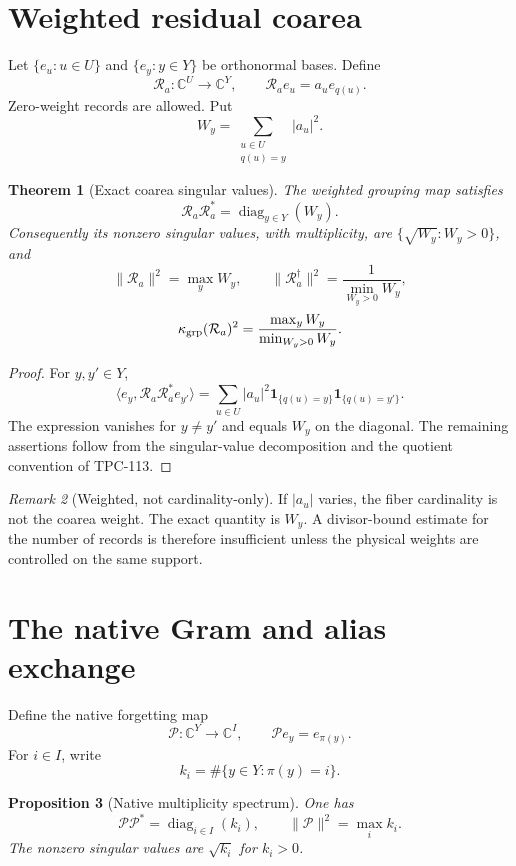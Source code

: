 \documentclass[11pt]{article}
\newtheorem{theorem}{Theorem}[section]
\newtheorem{proposition}[theorem]{Proposition}
\theoremstyle{definition}
\theoremstyle{remark}
\newtheorem{remark}[theorem]{Remark}
\newcommand{\C}{\mathbb C}
\newcommand{\one}{\mathbf 1}
\newcommand{\Res}{\mathcal R}
\newcommand{\Nat}{\mathcal P}
\begin{document}
\section{Weighted residual coarea}

Let \(\{e_u:u\in U\}\) and \(\{e_y:y\in Y\}\) be orthonormal bases.
Define
\[
 \Res_a:\C^U\to\C^Y,\qquad
 \Res_a e_u=a_u e_{q(u)}.
\]
Zero-weight records are allowed.  Put
\[
 W_y=\sum_{\substack{u\in U\\q(u)=y}}|a_u|^2.
\]

\begin{theorem}[Exact coarea singular values]
\label{thm:coarea}
The weighted grouping map satisfies
\[
 \boxed{\quad
 \Res_a\Res_a^*=\operatorname{diag}_{y\in Y}(W_y).
 \quad}
\]
Consequently its nonzero singular values, with multiplicity, are
\(\{\sqrt{W_y}:W_y>0\}\), and
\[
 \|\Res_a\|^2=\max_yW_y,\qquad
 \|\Res_a^\dagger\|^2=\frac1{\min_{W_y>0}W_y},
\]
\[
 \kappa_{\rm grp}(\Res_a)^2
 =\frac{\max_yW_y}{\min_{W_y>0}W_y}.
\]
\end{theorem}

\begin{proof}
For \(y,y'\in Y\),
\[
 \langle e_y,\Res_a\Res_a^*e_{y'}\rangle
 =\sum_{u\in U}|a_u|^2
   \one_{\{q(u)=y\}}\one_{\{q(u)=y'\}}.
\]
The expression vanishes for \(y\ne y'\) and equals \(W_y\) on the
diagonal.  The remaining assertions follow from the singular-value
decomposition and the quotient convention of TPC-113.
\end{proof}

\begin{remark}[Weighted, not cardinality-only]
If \(|a_u|\) varies, the fiber cardinality is not the coarea weight.
The exact quantity is \(W_y\).  A divisor-bound estimate for the
number of records is therefore insufficient unless the physical
weights are controlled on the same support.
\end{remark}

\section{The native Gram and alias exchange}

Define the native forgetting map
\[
 \Nat:\C^Y\to\C^I,\qquad \Nat e_y=e_{\pi(y)}.
\]
For \(i\in I\), write
\[
 k_i=\#\{y\in Y:\pi(y)=i\}.
\]

\begin{proposition}[Native multiplicity spectrum]
\label{prop:native}
One has
\[
 \Nat\Nat^*=\operatorname{diag}_{i\in I}(k_i),
 \qquad
 \|\Nat\|^2=\max_i k_i.
\]
The nonzero singular values are \(\sqrt{k_i}\) for \(k_i>0\).
\end{proposition}
\end{document}
